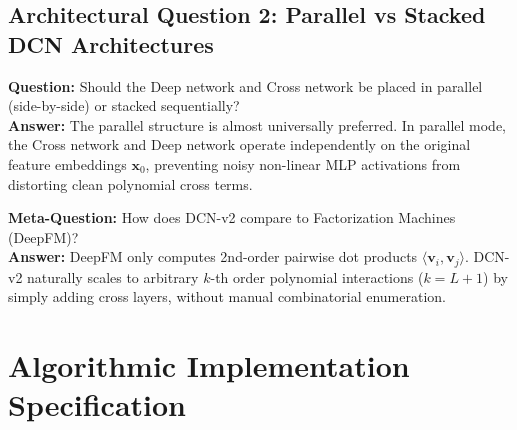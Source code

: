 \documentclass[11pt,a4paper]{article}
\theoremstyle{definition}
\begin{document}
\subsection{Architectural Question 2: Parallel vs Stacked DCN Architectures}
\textbf{Question:} Should the Deep network and Cross network be placed in parallel (side-by-side) or stacked sequentially?\\
\textbf{Answer:} The parallel structure is almost universally preferred. In parallel mode, the Cross network and Deep network operate independently on the original feature embeddings $\mathbf{x}_0$, preventing noisy non-linear MLP activations from distorting clean polynomial cross terms.

\textbf{Meta-Question:} How does DCN-v2 compare to Factorization Machines (DeepFM)?\\
\textbf{Answer:} DeepFM only computes 2nd-order pairwise dot products $\langle \mathbf{v}_i, \mathbf{v}_j \rangle$. DCN-v2 naturally scales to arbitrary $k$-th order polynomial interactions ($k = L + 1$) by simply adding cross layers, without manual combinatorial enumeration.

\section{Algorithmic Implementation Specification}
\end{document}
